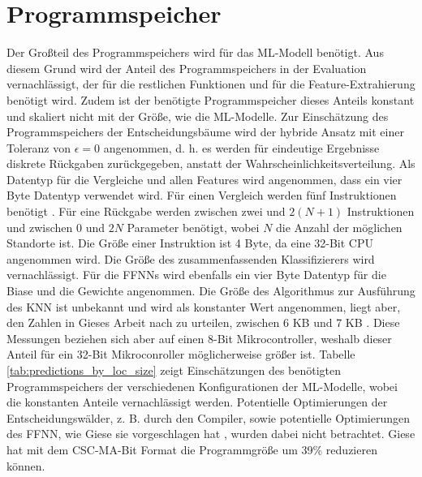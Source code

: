 \section{Programmspeicher}
Der Großteil des Programmspeichers wird für das ML-Modell benötigt.
Aus diesem Grund wird der Anteil des Programmspeichers in der Evaluation vernachlässigt,
der für die restlichen Funktionen und für die Feature-Extrahierung benötigt wird.
Zudem ist der benötigte Programmspeicher dieses Anteils konstant und skaliert nicht mit der Größe, wie die ML-Modelle.
\newline
\newline
Zur Einschätzung des Programmspeichers der Entscheidungsbäume wird der hybride Ansatz mit einer Toleranz von $\epsilon=0$ angenommen,
d. h. es werden für eindeutige Ergebnisse diskrete Rückgaben zurückgegeben, anstatt der Wahrscheinlichkeitsverteilung.
Als Datentyp für die Vergleiche und allen Features wird angenommen, dass ein vier Byte Datentyp verwendet wird.
Für einen Vergleich werden fünf Instruktionen benötigt \cite{dymelThesis}.
Für eine Rückgabe werden zwischen zwei und $2(N+1)$ Instruktionen und zwischen 0 und $2N$ Parameter benötigt,
wobei $N$ die Anzahl der möglichen Standorte ist.
Die Größe einer Instruktion ist 4 Byte, da eine 32-Bit CPU angenommen wird.
Die Größe des zusammenfassenden Klassifizierers wird vernachlässigt.
\newline
\newline
Für die FFNNs wird ebenfalls ein vier Byte Datentyp für die Biase und die Gewichte angenommen.
Die Größe des Algorithmus zur Ausführung des KNN ist unbekannt und wird als konstanter Wert angenommen,
liegt aber, den Zahlen in Gieses Arbeit nach zu urteilen, zwischen 6 KB und 7 KB \cite{gieseThesis}.
Diese Messungen beziehen sich aber auf einen 8-Bit Mikrocontroller, weshalb dieser Anteil für ein 32-Bit Mikroconroller möglicherweise größer ist.
\newline
\newline
Tabelle \ref{tab:predictions_by_loc_size} zeigt Einschätzungen des benötigten Programmspeichers der verschiedenen Konfigurationen der ML-Modelle,
wobei die konstanten Anteile vernachlässigt werden.
Potentielle Optimierungen der Entscheidungswälder, z. B. durch den Compiler,
sowie potentielle Optimierungen des FFNN, wie Giese sie vorgeschlagen hat \cite{gieseThesis}, wurden dabei nicht betrachtet.
\newline
\newline
Giese hat mit dem CSC-MA-Bit Format die Programmgröße um 39\% reduzieren können.
